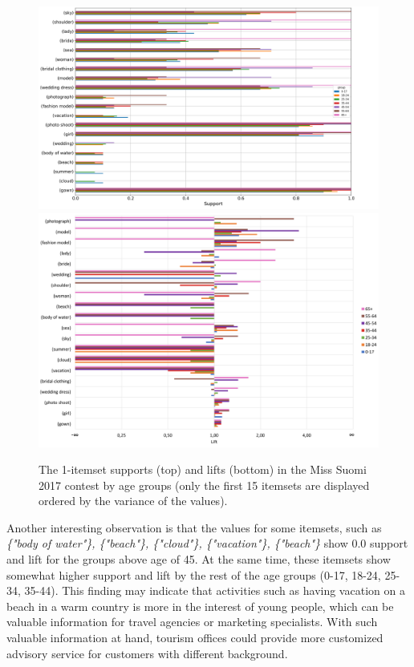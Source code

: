 \begin{figure}[] 
    \begin{center}
        \includegraphics[width=1.2\textwidth,center]{Images/itemset_supports-age_group-Miss_Helsinki-1_itemset.png}
        \includegraphics[width=1.2\textwidth,center]{Images/itemset_lifts-age_group-Miss_Suomi-1_itemsets.png}
        \caption{The 1-itemset supports (top) and lifts (bottom) in the Miss Suomi 2017 contest by age groups (only the first 15 itemsets are displayed ordered by the variance of the values).}
        \label{itemset_supports-age_group-Miss_Helsinki-1_itemset}
    \end{center}
\end{figure}

Another interesting observation is that the values for some itemsets, such as \emph{\{"body of water"\}, \{"beach"\}, \{"cloud"\}, \{"vacation"\}, \{"beach"\}} show 0.0 support and lift for the groups above age of 45. At the same time, these itemsets show somewhat higher support and lift by the rest of the age groups (0-17, 18-24, 25-34, 35-44). This finding may indicate that activities such as having vacation on a beach in a warm country is more in the interest of young people, which can be valuable information for travel agencies or marketing specialists. With such valuable information at hand, tourism offices could provide more customized advisory service for customers with different background. 

